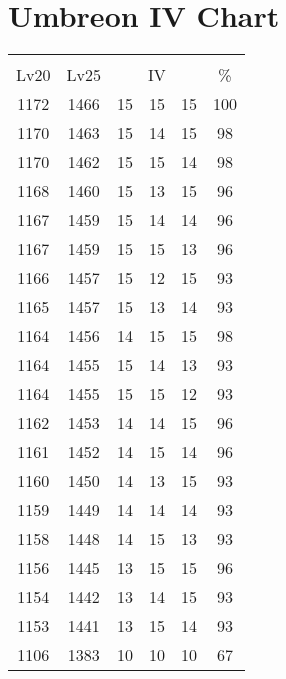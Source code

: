 \documentclass{article}%
\begin{document}
%
\normalsize%
\section{Umbreon IV Chart}%
\label{sec:Umbreon IV Chart}%
\renewcommand{\arraystretch}{1.5}%
\begin{tabular}{|c|c|c|c|c|c|}%
\hline%
\multicolumn{6}{|c|}{\textcolor{white}{ 
\linebreak{Umbreon}
}%
\cellcolor{black}}\\%
\multicolumn{1}{|c}{Lv20}&\multicolumn{1}{c|}{Lv25}&\multicolumn{3}{c|}{IV}&\multicolumn{1}{|c|}{\%}\\%
\hline%
\rowcolor{color100}%
1172&1466&15&15&15&100\\%
\hline%
\rowcolor{color98}%
1170&1463&15&14&15&98\\%
\hline%
\rowcolor{color98}%
1170&1462&15&15&14&98\\%
\hline%
\rowcolor{color96}%
1168&1460&15&13&15&96\\%
\hline%
\rowcolor{color96}%
1167&1459&15&14&14&96\\%
\hline%
\rowcolor{color96}%
1167&1459&15&15&13&96\\%
\hline%
\rowcolor{color93}%
1166&1457&15&12&15&93\\%
\hline%
\rowcolor{color93}%
1165&1457&15&13&14&93\\%
\hline%
\rowcolor{color98}%
1164&1456&14&15&15&98\\%
\hline%
\rowcolor{color93}%
1164&1455&15&14&13&93\\%
\hline%
\rowcolor{color93}%
1164&1455&15&15&12&93\\%
\hline%
\rowcolor{color96}%
1162&1453&14&14&15&96\\%
\hline%
\rowcolor{color96}%
1161&1452&14&15&14&96\\%
\hline%
\rowcolor{color93}%
1160&1450&14&13&15&93\\%
\hline%
\rowcolor{color93}%
1159&1449&14&14&14&93\\%
\hline%
\rowcolor{color93}%
1158&1448&14&15&13&93\\%
\hline%
\rowcolor{color96}%
1156&1445&13&15&15&96\\%
\hline%
\rowcolor{color93}%
1154&1442&13&14&15&93\\%
\hline%
\rowcolor{color93}%
1153&1441&13&15&14&93\\%
\hline%
\rowcolor{color91}%
1106&1383&10&10&10&67\\%
\end{tabular}

%
\end{document}
